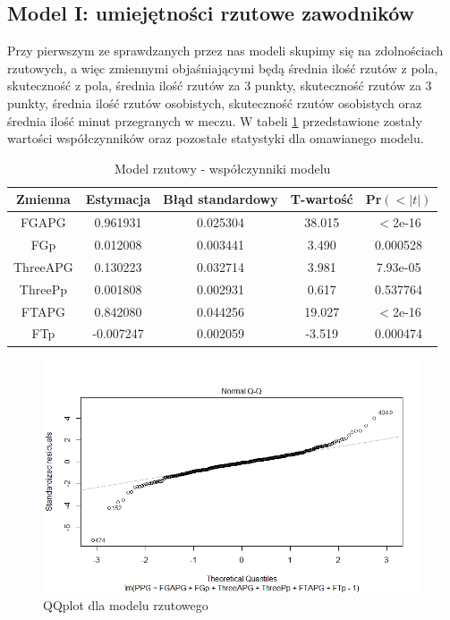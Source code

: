 \documentclass[11pt,a4paper]{article}
\begin{document}
\subsection{Model I: umiejętności rzutowe zawodników}
Przy pierwszym ze sprawdzanych przez nas modeli skupimy się na zdolnościach rzutowych, a więc zmiennymi objaśniającymi będą średnia ilość rzutów z pola, skuteczność z pola, średnia ilość rzutów za 3 punkty, skuteczność rzutów za 3 punkty, średnia ilość rzutów osobistych, skuteczność rzutów osobistych oraz średnia ilość minut przegranych w meczu. W tabeli \ref{offense} przedstawione zostały wartości współczynników oraz pozostałe statystyki dla omawianego modelu. 
\begin{table}[H]
	\begin{tabular}{| c | c | c | c | c |}
		\hline
		Zmienna & Estymacja & Błąd standardowy & T-wartość & Pr$(<|t|)$\\ \hline
		FGAPG & 0.961931 & 0.025304 & 38.015 & $<$2e-16\\ \hline
		FGp & 0.012008 & 0.003441 & 3.490 & 0.000528\\ \hline
		ThreeAPG & 0.130223 & 0.032714 & 3.981 & 7.93e-05\\ \hline 
		ThreePp & 0.001808 & 0.002931 & 0.617 & 0.537764\\ \hline
		FTAPG & 0.842080 & 0.044256 & 19.027 & $<$2e-16\\ \hline
		FTp  & -0.007247 & 0.002059 & -3.519 & 0.000474\\ \hline
	\end{tabular}
	\caption{Model rzutowy - współczynniki modelu}
	\label{offense}
\end{table}
\begin{figure}[t]
\includegraphics[width=\textwidth]{offense_2}
\caption{QQplot dla modelu rzutowego}
\label{qqplot_offense}
\centering
\end{figure}
\end{document}
